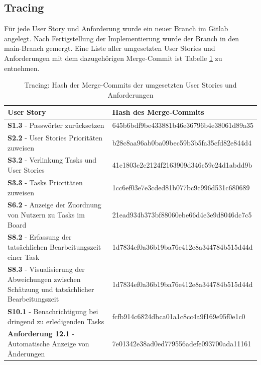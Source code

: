 \documentclass[a4paper,11pt]{article}
\begin{document}
\subsection{Tracing}
Für jede User Story und Anforderung wurde ein neuer Branch im Gitlab angelegt.
Nach Fertigstellung der Implementierung wurde der Branch in den main-Branch gemergt.
Eine Liste aller umgesetzten User Stories und Anforderungen mit dem dazugehörigen Merge-Commit ist Tabelle \ref{tab:tracing} zu entnehmen.

\begin{table}[ht]
	\centering
	\small
	\renewcommand{\arraystretch}{1.4}
	\begin{tabular}{| p{3.5cm} | p{10cm} |}
		\hline
		\textbf{User Story}                                                                                   & \textbf{Hash des Merge-Commits}          \\
		\hline
		\textbf{S1.3} - Passwörter zurücksetzen                                                               & 645b6bdf9be433881b46e36796b4e38061d89a35 \\
		\hline
		\textbf{S2.2} - User Stories Prioritäten zuweisen                                                     & b28c8aa96ab0ba09bec59b3b5fa35cfd82e844d4 \\
		\hline
		\textbf{S3.2} - Verlinkung Tasks und User Stories                                                     & 41c1803c2c2124f2163909d346c59c24d1abdd9b \\
		\hline
		\textbf{S3.3} - Tasks Prioritäten zuweisen                                                            & 1cc6ef03e7e3cded81b077bc9c996d531c680689 \\
		\hline
		\textbf{S6.2} - Anzeige der Zuordnung von Nutzern zu Tasks im Board                                   & 21ead934b373bf88060ebe66d4e3e9d8046dc7c5 \\
		\hline
		\textbf{S8.2} - Erfassung der tatsächlichen Bearbeitungszeit einer Task                               & 1d7834ef0a36b19ba76e412e8a344784b515d44d \\
		\hline
		\textbf{S8.3} - Visualisierung der Abweichungen zwischen Schätzung und tatsächlicher Bearbeitungszeit & 1d7834ef0a36b19ba76e412e8a344784b515d44d \\
		\hline
		\textbf{S10.1} - Benachrichtigung bei dringend zu erledigenden Tasks                                  & fcfb914c6824dbca01a1c8cc4a9f169e95f0e1c0 \\
		\hline
		\textbf{Anforderung 12.1} - Automatische Anzeige von Änderungen                                       & 7e01342e38ad0ed779556adefe093700ada11161 \\
		\hline
	\end{tabular}
	\caption{Tracing: Hash der Merge-Commits der umgesetzten User Stories und Anforderungen}
	\label{tab:tracing}
\end{table}
\end{document}
